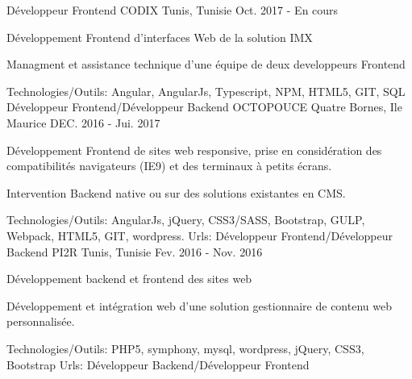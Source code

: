 \begin{cventries}
  \techentries
    {Développeur Frontend}
    {CODIX}
    {Tunis, Tunisie}
    {Oct. 2017 - En cours}
    {
      \begin{cvitems}
		\item {Développement Frontend d'interfaces Web de la solution IMX }		
		\item {Managment et assistance technique d'une équipe de deux developpeurs Frontend}		
      \end{cvitems}
    }
    {\textcolor{awesome}{Technologies/Outils: } {\color{graytext}}  {Angular, AngularJs, Typescript, NPM, HTML5, GIT, SQL}}
	{} 
    { 
    }
  \techentries
    {Développeur Frontend/Développeur Backend}
    {OCTOPOUCE}
    {Quatre Bornes, Ile Maurice}
    {DEC. 2016 - Jui. 2017}
    {
      \begin{cvitems}
		\item {Développement Frontend de sites web responsive, prise en considération des compatibilités navigateurs (IE9) et des terminaux à petits écrans.}		
		\item {Intervention Backend native ou sur des solutions existantes en CMS.}
      \end{cvitems}
    }
    {\textcolor{awesome}{Technologies/Outils: } {\color{graytext}}  {AngularJs, jQuery, CSS3/SASS, Bootstrap, GULP, Webpack, HTML5, GIT, wordpress.}}
    {Urls:} 
    { \href{http://anahita.mu/}{ \break
    }}
  \techentries
    {Développeur Frontend/Développeur Backend}
    {PI2R}
    {Tunis, Tunisie}
    {Fev. 2016 - Nov. 2016}
    {
      \begin{cvitems}
        \item {Développement backend et frontend des sites web }
        \item {Développement et intégration web d'une solution gestionnaire de contenu web personnalisée. }
      \end{cvitems}
    }
    {\textcolor{awesome}{Technologies/Outils: } {\color{graytext}}  {PHP5, symphony, mysql, wordpress, jQuery, CSS3, Bootstrap}}
    {Urls:} 
    {
    \href{http://www.milddream.com/fr/ }{} \break
    \href{http://www.ozeol.com/fr/}{} \break
    }    
  \techentries
    {Développeur Backend/Développeur Frontend}

\end{cventries}
